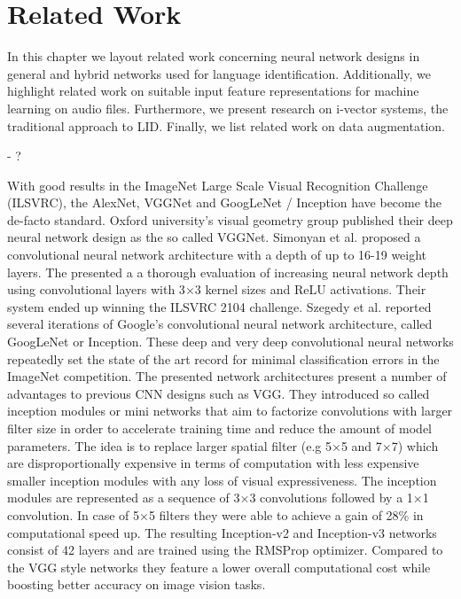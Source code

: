 \section{Related Work}
\label{sec:related_work}
In this chapter we layout related work concerning neural network designs in general and hybrid networks used for language identification. Additionally, we highlight related work on suitable input feature representations for machine learning on audio files. Furthermore, we present research on i-vector systems, the traditional approach to LID. Finally, we list related work on data augmentation. 

- ?

	
%	


With good results in the ImageNet Large Scale Visual Recognition Challenge (ILSVRC)\cite{ILSVRC15}, the AlexNet\cite{krizhevsky2012imagenet}, VGGNet\cite{simonyan2014very} and GoogLeNet / Inception\cite{szegedy2015going} have become the de-facto standard. 
Oxford university's visual geometry group published their deep neural network design as the so called VGGNet. Simonyan et al.\cite{simonyan2014very, Chatfield14} proposed a convolutional neural network architecture with a depth of up to 16-19 weight layers. The presented a a thorough evaluation of increasing neural network depth using convolutional layers with 3$\times$3 kernel sizes and ReLU activations. Their system ended up winning the ILSVRC 2104 challenge.
Szegedy et al. reported several iterations of Google's convolutional neural network architecture, called GoogLeNet or Inception\cite{szegedy2015going, szegedy2016rethinking, szegedy2016inception}. These deep and very deep convolutional neural networks repeatedly set the state of the art record for minimal classification errors in the ImageNet competition. The presented network architectures present a number of advantages to previous CNN designs such as VGG. They introduced so called inception modules or mini networks that aim to factorize convolutions with larger filter size in order to accelerate training time and reduce the amount of model parameters. The idea is to replace larger spatial filter (e.g 5$\times$5 and 7$\times$7) which are disproportionally expensive in terms of computation with less expensive smaller inception modules with any loss of visual expressiveness. The inception modules are represented as a sequence of 3$\times$3 convolutions followed by a 1$\times$1 convolution. In case of 5$\times$5 filters they were able to achieve a gain of 28\% in computational speed up. The resulting Inception-v2 and Inception-v3 networks consist of 42 layers and are trained using the RMSProp\cite{tieleman2012lecture} optimizer. Compared to the VGG style networks they feature a lower overall computational cost while boosting better accuracy on image vision tasks.

